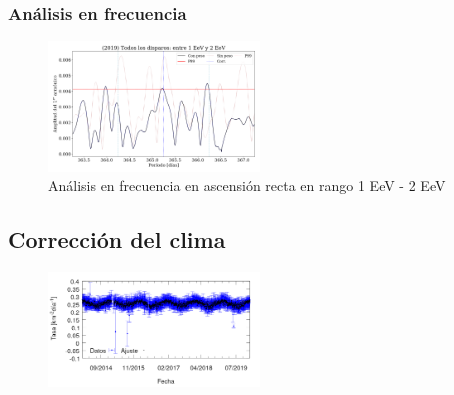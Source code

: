 \subsubsection{Análisis en frecuencia}

\begin{figure}[H]
	\centering
	\includegraphics[width=0.5\textwidth]{2019_AllTriggers_1_2_EeV_con_vs_sin_peso.png}
	\caption{Análisis en frecuencia en ascensión recta en rango 1 EeV - 2 EeV}
	\label{fig:consin}
\end{figure}


\subsection{Corrección del clima}

\begin{figure}[H]
	\centering
	\includegraphics[width=0.5\textwidth]{rate_Ajuste.png}
\end{figure}

